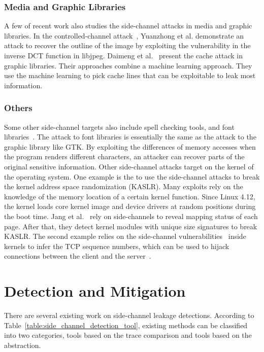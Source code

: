 \subsubsection{Media and Graphic Libraries}
A few of recent work also studies the side-channel attacks in media and graphic libraries. In the controlled-channel attack~\cite{xu2015controlled}, Yuanzhong et al. demonstrate an attack to recover the outline of the image by exploiting the vulnerability in the inverse DCT function in libjpeg. Daimeng et al.~\cite{wang2019unveiling} present the cache attack in graphic libraries. Their approaches combine a machine learning approach. They use the machine learning to pick cache lines that can be exploitable to leak most information.
\subsubsection{Others}
Some other side-channel targets also include spell checking tools, and font libraries~\cite{xu2015controlled}. The attack to font libraries is essentially the same as the attack to the graphic library like GTK. By exploiting the differences of memory accesses when the program renders different characters, an attacker can recover parts of the original sensitive information. Other side-channel attacks target on the kernel of the operating system. One example is the to use the side-channel attacks to break the kernel address space randomization (KASLR).
Many exploits rely on the knowledge of the memory location of a certain kernel function. Since Linux 4.12, the kernel loads core kernel image and device drivers at random positions during the boot time. Jang et al.~\cite{jang2016breaking} rely on side-channels to reveal mapping status of each page. After that, they detect kernel modules with unique size signatures to break KASLR. The second example relies on the side-channel vulnerabilities~\cite{cao2019principled} inside kernels to infer the TCP sequence numbers, which can be used to hijack connections between the client and the server~\cite{cao2016off}.

\section{Detection and Mitigation}
There are several existing work on side-channel leakage detections. According to Table~\ref{table:side_channel_detection_tool}, existing methods can be classified into two categories, tools based on the trace comparison and tools based on the abstraction.

